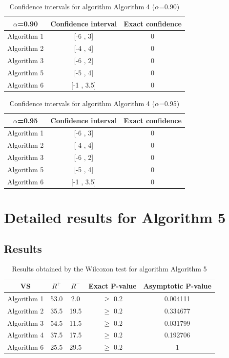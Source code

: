 \documentclass[a4paper,10pt]{article}
\begin{document}
\begin{table}[!htp]
\centering\small
\begin{tabular}{
|c|c|c|}
\hline
 $\alpha$=0.90 & Confidence interval & Exact confidence \\ \hline 
Algorithm 1 & [-6 , 3] & 0\\ \hline 
Algorithm 2 & [-4 , 4] & 0\\ \hline 
Algorithm 3 & [-6 , 2] & 0\\ \hline 
Algorithm 5 & [-5 , 4] & 0\\ \hline 
Algorithm 6 & [-1 , 3.5] & 0\\ \hline 

\end{tabular}
\caption{Confidence intervals for algorithm Algorithm 4 ($\alpha$=0.90)}
\end{table}
\begin{table}[!htp]
\centering\small
\begin{tabular}{
|c|c|c|}
\hline
 $\alpha$=0.95 & Confidence interval & Exact confidence \\ \hline 
Algorithm 1 & [-6 , 3] & 0\\ \hline 
Algorithm 2 & [-4 , 4] & 0\\ \hline 
Algorithm 3 & [-6 , 2] & 0\\ \hline 
Algorithm 5 & [-5 , 4] & 0\\ \hline 
Algorithm 6 & [-1 , 3.5] & 0\\ \hline 

\end{tabular}
\caption{Confidence intervals for algorithm Algorithm 4 ($\alpha$=0.95)}
\end{table}

 \clearpage 


\section{Detailed results for Algorithm 5}


\subsection{Results}

\begin{table}[!htp]
\centering\small
\begin{tabular}{
|c|c|c|c|c|}
\hline
 VS & $R^{+}$ & $R^{-}$ & Exact P-value & Asymptotic P-value \\ \hline 
Algorithm 1 & 53.0 & 2.0 & $\geq$ 0.2 & 0.004111\\ \hline 
Algorithm 2 & 35.5 & 19.5 & $\geq$ 0.2 & 0.334677\\ \hline 
Algorithm 3 & 54.5 & 11.5 & $\geq$ 0.2 & 0.031799\\ \hline 
Algorithm 4 & 37.5 & 17.5 & $\geq$ 0.2 & 0.192706\\ \hline 
Algorithm 6 & 25.5 & 29.5 & $\geq$ 0.2 & 1\\ \hline 

\end{tabular}
\caption{Results obtained by the Wilcoxon test for algorithm Algorithm 5}
\end{table}
\end{document}
